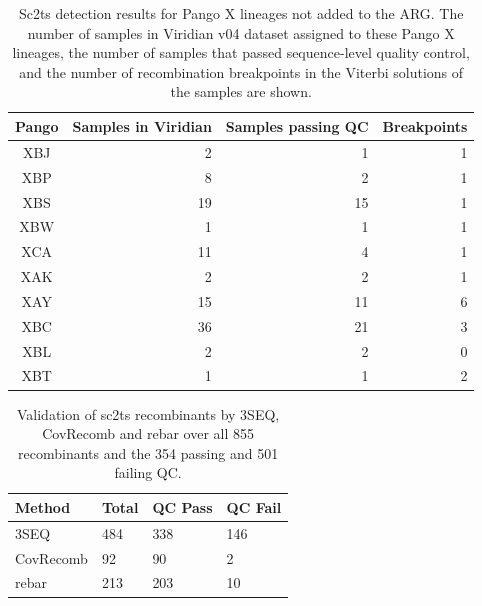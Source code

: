\documentclass[12pt]{article}
\begin{document}
\begin{table}
\centering
\caption{
Sc2ts detection results for Pango X lineages not added to the ARG.
The number of samples in Viridian v04 dataset
assigned to these Pango X lineages,
the number of samples that passed sequence-level quality control, and
the number of recombination breakpoints
in the Viterbi solutions of the samples
are shown.
}
\label{tab:extra_hmm_results}
\begin{tabular}{crrr}
\toprule
Pango & Samples in Viridian & Samples passing QC & Breakpoints \\
\midrule
XBJ & 2 & 1 & 1\\
XBP & 8 & 2 & 1\\
XBS & 19 & 15 & 1\\
XBW & 1 & 1 & 1\\
XCA & 11 & 4 & 1\\
XAK & 2 & 2 & 1\\   %
XAY & 15 & 11 & 6\\ %
XBC & 36 & 21 & 3\\ %
XBL & 2 & 2 & 0\\   %
XBT & 1 & 1 & 2\\   %
\bottomrule
\end{tabular}
\end{table}




\begin{table}
\caption{Validation of sc2ts recombinants by 3SEQ, CovRecomb and rebar over
all 855 recombinants and the 354 passing and 501 failing QC.
}
\label{tab:recombinant_validation}
\centering
\begin{tabular}{llll}
\toprule
Method & Total    & QC Pass & QC Fail \\
\midrule
3SEQ        & 484 & 338     & 146 \\
CovRecomb   & 92  & 90      & 2\\
rebar       & 213 & 203     & 10 \\
\bottomrule
\end{tabular}
\end{table}
\end{document}
